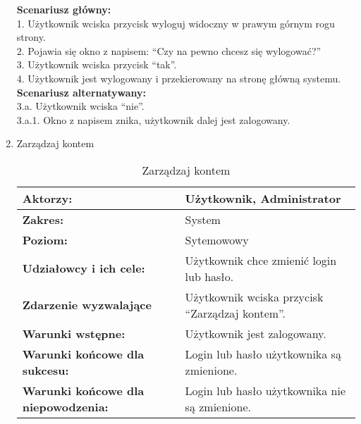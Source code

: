 \begin{enumerate}[label=(\Roman*)]
\textbf{Scenariusz główny:} \\
1. Użytkownik wciska przycisk wyloguj widoczny w prawym górnym rogu strony. \\
2. Pojawia się okno z napisem: “Czy na pewno chcesz się wylogować?” \\
3. Użytkownik wciska przycisk “tak”. \\
4. Użytkownik jest wylogowany i przekierowany na stronę główną systemu. \\
\textbf{Scenariusz alternatywany: \\
} 
3.a. Użytkownik wciska “nie”. \\
3.a.1. Okno z napisem znika, użytkownik dalej jest zalogowany. \\
\item Zarządzaj kontem
\begin{table}[H]
\centering
\caption{Zarządzaj kontem}
\label{zarzadzajkontem}
\begin{tabular}{|p{7cm}|p{7cm}|}
  \hline 
  \textbf{Aktorzy:} & Użytkownik, Administrator\\
  \hline
  \textbf{Zakres:} & System \\
	\hline
  \textbf{Poziom:} & Sytemowowy \\
	\hline
  \textbf{Udziałowcy i ich cele: } & Użytkownik chce zmienić login lub hasło. \\
	\hline
  \textbf{Zdarzenie wyzwalające } & Użytkownik wciska przycisk “Zarządzaj kontem”. \\
	\hline
  \textbf{Warunki wstępne: } & Użytkownik jest zalogowany.\\
	\hline
  \textbf{Warunki końcowe dla sukcesu:} & Login lub hasło użytkownika są zmienione.\\
	\hline
  \textbf{Warunki końcowe dla niepowodzenia:} & Login lub hasło użytkownika nie są zmienione. \\
  \hline
\end{tabular} 
\end{table}


\end{enumerate}
